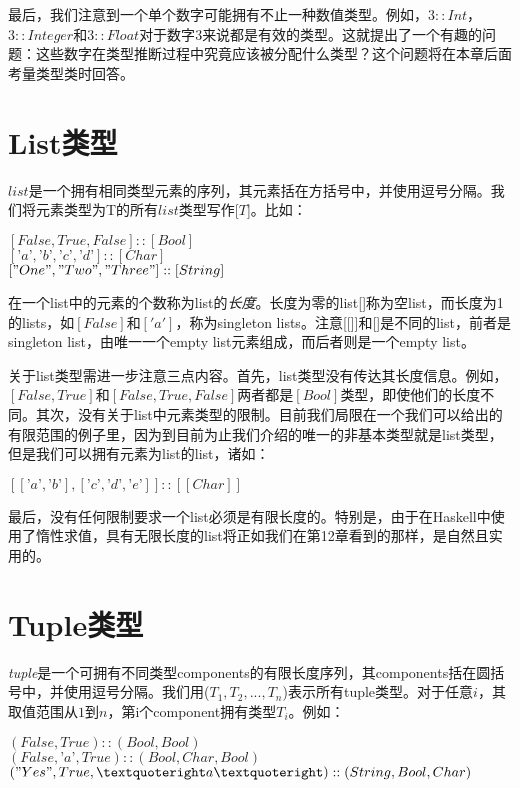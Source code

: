 最后，我们注意到一个单个数字可能拥有不止一种数值类型。例如，$3 :: Int$，$3 ::
Integer$和$3 ::
Float$对于数字$3$来说都是有效的类型。这就提出了一个有趣的问题：这些数字在类型推断过程中究竟应该被分配什么类型？这个问题将在本章后面考量类型类时回答。

\section{List类型}
$list$是一个拥有相同类型元素的序列，其元素括在方括号中，并使用逗号分隔。我们将元素类型为T的所有$list$类型写作[$T$]。比如：

\noindent\hspace*{1cm} $[False, True, False ] :: [Bool]$\\
\hspace*{1cm} $[’a’, ’b’, ’c’, ’d’] :: [Char]$\\
\hspace*{1cm} $["One", "Two", "Three"] :: [String]$

在一个list中的元素的个数称为list的\textit{长度}。长度为零的list[]称为空list，而长度为1的lists，如$[False]$和$['a']$，称为singleton lists。注意[[]]和[]是不同的list，前者是singleton list，由唯一一个empty list元素组成，而后者则是一个empty list。

关于list类型需进一步注意三点内容。首先，list类型没有传达其长度信息。例如，$[False,
True]$和$[False, True,
False]$两者都是$[Bool]$类型，即使他们的长度不同。其次，没有关于list中元素类型的限制。目前我们局限在一个我们可以给出的有限范围的例子里，因为到目前为止我们介绍的唯一的非基本类型就是list类型，但是我们可以拥有元素为list的list，诸如：

\noindent\hspace*{1cm} $[[’a’, ’b’], [’c’, ’d’, ’e’]] :: [[Char ]]$

最后，没有任何限制要求一个list必须是有限长度的。特别是，由于在Haskell中使用了惰性求值，具有无限长度的list将正如我们在第12章看到的那样，是自然且实用的。

\section{Tuple类型}
\textit{tuple}是一个可拥有不同类型components的有限长度序列，其components括在圆括号中，并使用逗号分隔。我们用($T_1,T_2,...,T_n$)表示所有tuple类型。对于任意$i$，其取值范围从$1$到$n$，第i个component拥有类型$T_i$。例如：

\noindent\hspace*{1cm} $(False, True) :: (Bool, Bool)$\\
\hspace*{1cm} $(False, ’a’, True) :: (Bool, Char , Bool)$\\
\hspace*{1cm} $("Yes", True, ’a’) :: (String, Bool , Char)$

